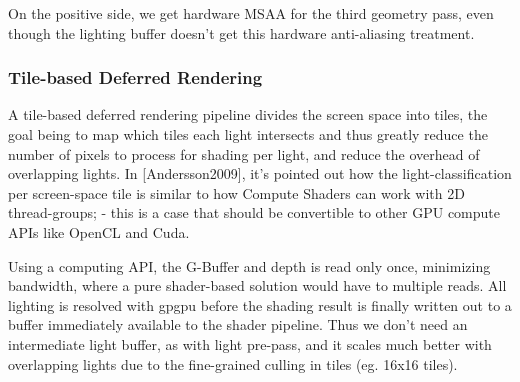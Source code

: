 On the positive side, we get hardware MSAA for the third geometry pass, even though the lighting buffer doesn't get this hardware anti-aliasing treatment.

\subsubsection{Tile-based Deferred Rendering}

A tile-based deferred rendering pipeline divides the screen space into tiles, the goal being to map which tiles each light intersects and thus greatly reduce the number of pixels to process for shading per light, and reduce the overhead of overlapping lights. In [Andersson2009], it's pointed out how the light-classification per screen-space tile is similar to how Compute Shaders can work with 2D thread-groups; - this is a case that should be convertible to other GPU compute APIs like OpenCL and Cuda. 

Using a computing API, the G-Buffer and depth is read only once, minimizing bandwidth, where a pure shader-based solution would have to multiple reads. All lighting is resolved with gpgpu before the shading result is finally written out to a buffer immediately available to the shader pipeline. Thus we don't need an intermediate light buffer, as with light pre-pass, and it scales much better with overlapping lights due to the fine-grained culling in tiles (eg. 16x16 tiles).